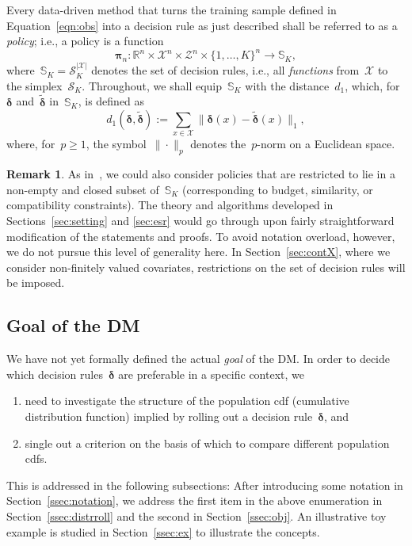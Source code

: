 \documentclass[11pt, a4paper]{article}
\newcommand{\R}{\mathbb{R}}
\theoremstyle{definition}
\newtheorem{remark}{Remark}[section]
\begin{document}
Every data-driven method that turns the training sample defined in Equation~\eqref{eqn:obs} into a decision rule as just described shall be referred to as a \emph{policy}; i.e., a policy is a function
%
\begin{equation}\label{eqn:poly}
\bm{\pi}_n: \R^n \times \mathcal{X}^n \times \mathcal{Z}^n \times \{1, \hdots, K\}^n \to \mathbb{S}_K,
\end{equation}
%
where~$\mathbb{S}_K = \mathscr{S}_K^{|\mathcal{X}|}$ denotes the set of decision rules, i.e., all \emph{functions} from~$\mathcal{X}$ to the simplex~$\mathscr{S}_K$. Throughout, we shall equip~$\mathbb{S}_K$ with the distance~$d_1$, which, for~$\bm{\delta}$ and~$\tilde{\bm{\delta}}$ in~$\mathbb{S}_K$, is defined as 
\begin{equation}\label{eqn:dstS}
d_1(\bm{\delta},  \tilde{\bm{\delta}}) := \sum_{x \in \mathcal{X}} \|\bm{\delta}(x) - \tilde{\bm{\delta}}(x)\|_1,
\end{equation}
where, for~$p \geq 1$, the symbol~$\|\cdot\|_p$ denotes the~$p$-norm on a Euclidean space.
\begin{remark}\label{rem:constr}
As in~\cite{kpv3}, we could also consider policies that are restricted to lie in a non-empty and closed subset of~$\mathbb{S}_K$ (corresponding to budget, similarity, or compatibility constraints). The theory and algorithms developed in Sections~\ref{sec:setting} and \ref{sec:esr} would go through upon fairly straightforward modification of the statements and proofs. To avoid notation overload, however, we do not pursue this level of generality here. In Section~\ref{sec:contX}, where we consider non-finitely valued covariates, restrictions on the set of decision rules will be imposed.
\end{remark}

\subsection{Goal of the DM}\label{sec:goal}

We have not yet formally defined the actual \emph{goal} of the DM. In order to decide which decision rules~$\bm{\delta}$ are preferable in a specific context, we 
\begin{enumerate}
\item need to investigate the structure of the population cdf (cumulative distribution function) implied by rolling out a decision rule~$\bm{\delta}$, and
\item single out a criterion on the basis of which to compare different population cdfs. 
\end{enumerate}
%
This is addressed in the following subsections: After introducing some notation in Section~\ref{ssec:notation}, we address the first item in the above enumeration in Section~\ref{ssec:distrroll} and the second in Section~\ref{ssec:obj}. An illustrative toy example is studied in Section~\ref{ssec:ex} to illustrate the concepts.
\end{document}
